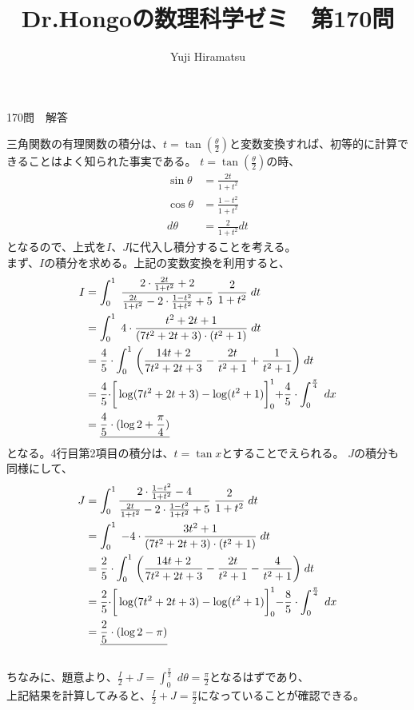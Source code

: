 \documentclass[a4j,10pt,oneside,openany]{jsbook}
\title{{\Huge \textbf{Dr.Hongoの数理科学ゼミ　第170問}}\\}
\author{Yuji Hiramatsu}
\date{}
\begin{document}
%
%
\maketitle
%
%


{\Huge 170問　解答}

\vspace{3\baselineskip}

三角関数の有理関数の積分は、$t=\tan (\frac{\theta}{2})$と変数変換すれば、初等的に計算できることはよく知られた事実である。
$t=\tan (\frac{\theta}{2})$の時、
\begin{align*}
\sin \theta &= \frac{2t}{1+t^2}\\
\cos \theta &= \frac{1-t^2}{1+t^2}\\
d\theta &= \frac{2}{1+t^2}dt
\end{align*}
となるので、上式を$I$、$J$に代入し積分することを考える。\\
まず、$I$の積分を求める。上記の変数変換を利用すると、
\begin{align*}
I &= \int_{0}^{1} \; \frac{2 \cdot \frac{2t}{1+t^2}+2}{\frac{2t}{1+t^2}-2 \cdot \frac{1-t^2}{1+t^2}+5} \; \frac{2}{1+t^2} \; dt \\
  &= \int_{0}^{1} \; 4 \cdot \frac{t^2+2t+1}{(7t^2+2t+3)\cdot(t^2+1)} \; dt \\
  &= \frac{4}{5} \cdot \int_{0}^{1} \; \biggr{(} \frac{14t+2}{7t^2+2t+3}-\frac{2t}{t^2+1}+\frac{1}{t^2+1} \biggl{)} \; dt \\
  &= \frac{4}{5} \cdot \biggr{[} \log(7t^2+2t+3)-\log(t^2+1) \biggl{]} ^{1} _{0}+\frac{4}{5} \cdot \int^{\frac{\pi}{4}}_{0}  \; dx \\
  &= \underline{\frac{4}{5} \cdot (\log 2+\frac{\pi}{4})}
\end{align*}
となる。4行目第2項目の積分は、$t=\tan x$とすることでえられる。
$J$の積分も同様にして、
\begin{align*}
J &= \int_{0}^{1} \frac{2 \cdot \frac{1-t^2}{1+t^2}-4}{\frac{2t}{1+t^2}-2 \cdot \frac{1-t^2}{1+t^2}+5} \; \frac{2}{1+t^2} \; dt \\
   &= \int_{0}^{1} \; -4 \cdot \frac{3t^2+1}{(7t^2+2t+3)\cdot(t^2+1)} \; dt \\
   &= \frac{2}{5} \cdot \int_{0}^{1} \; \biggr{(} \frac{14t+2}{7t^2+2t+3}-\frac{2t}{t^2+1}-\frac{4}{t^2+1} \biggl{)} \; dt \\
   &= \frac{2}{5} \cdot \biggr{[} \log(7t^2+2t+3)-\log(t^2+1) \biggl{]} ^{1} _{0}-\frac{8}{5} \cdot \int^{\frac{\pi}{4}}_{0}  \; dx \\
   &= \underline{\frac{2}{5} \cdot (\log 2-\pi)}
\end{align*}
\\
ちなみに、題意より、$\frac{I}{2}+J=\int^{\frac{\pi}{2}}_{0} \; d\theta=\frac{\pi}{2}$となるはずであり、\\
上記結果を計算してみると、$\frac{I}{2}+J=\frac{\pi}{2}$になっていることが確認できる。
\end{document}
